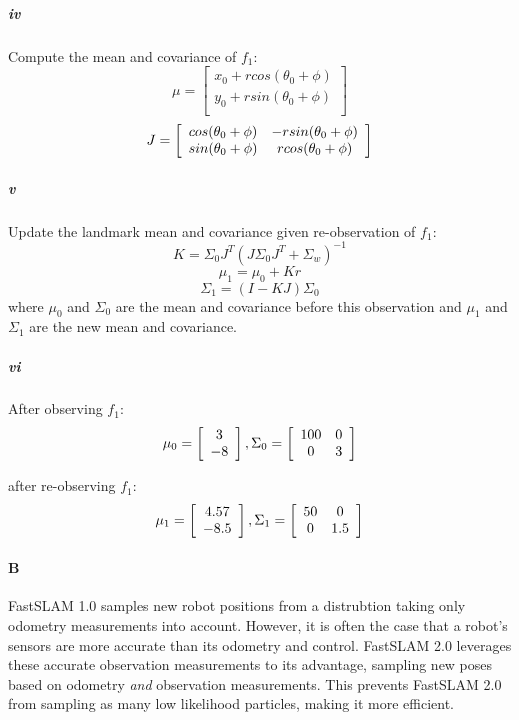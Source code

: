 \documentclass[12pt]{article}
\begin{document}
\subparagraph{iv} Compute the mean and covariance of $f_1$:
$$\mu = \left[ \begin{array}{c}
x_0 + rcos(\theta_0 + \phi) \\
y_0 + rsin(\theta_0 + \phi) \\
\end{array}\right]$$
$$J =  \left[ \begin{array}{c c}
cos(\theta_0 + \phi) & -rsin(\theta_0 + \phi)\\
sin(\theta_0 + \phi) & rcos(\theta_0 + \phi)\\
\end{array}\right]$$

\subparagraph{v} Update the landmark mean and covariance given re-observation of $f_1$:
$$K = \Sigma_0J^T\left(J\Sigma_0J^T + \Sigma_w\right)^{-1}$$
$$\mu_1 = \mu_0 + Kr$$
$$\Sigma_1 = (I-KJ)\Sigma_0$$
where $\mu_0$ and $\Sigma_0$ are the mean and covariance before this observation and $\mu_1$ and $\Sigma_1$ are the new mean and covariance.

\subparagraph{vi}
After observing $f_1$: \\
$$\mu_0 = \left[ \begin{array}{c}
3 \\
-8
\end{array}\right],
\Sigma_0 = \left[ \begin{array}{c c}
100 & 0 \\
0 & 3
\end{array}\right]$$

after re-observing $f_1$:
$$\mu_1 = \left[ \begin{array}{c}
4.57 \\
-8.5
\end{array}\right],
\Sigma_1 = \left[ \begin{array}{c c c c c c c}
50 & 0 \\
0 & 1.5
\end{array}\right]$$

\paragraph{B}
FastSLAM 1.0 samples new robot positions from a distrubtion taking only
odometry measurements into account. However, it is often the case that
a robot's sensors are more accurate than its odometry and control. FastSLAM 2.0
leverages these accurate observation measurements to its advantage, sampling
new poses based on odometry \emph{and} observation measurements. This prevents
FastSLAM 2.0 from sampling as many low likelihood particles, making it more
efficient.
\end{document}

